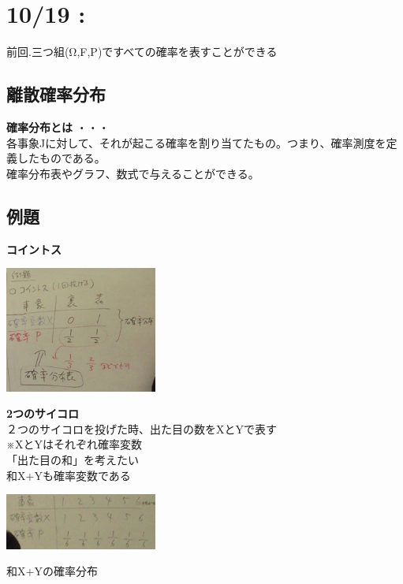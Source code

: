 \documentclass{jsarticle}
\begin{document}
\section{10/19 : }
	前回.三つ組(Ω,F,P)ですべての確率を表すことができる\\
	\subsection{離散確率分布}
		{\bf{確率分布とは}} ・・・ \\
		各事象Jに対して、それが起こる確率を割り当てたもの。つまり、確率測度を定義したものである。\\
		確率分布表やグラフ、数式で与えることができる。\\
	\subsection{例題}
		{\bf{コイントス}}
		\begin{center}
			\includegraphics[width=5cm]{10_19_1.JPG}
		\end{center}
		
		{\bf{2つのサイコロ}}\\
		２つのサイコロを投げた時、出た目の数をXとYで表す\\
		※XとYはそれぞれ確率変数\\
		「出た目の和」を考えたい\\
		和X+Yも確率変数である\\
		\begin{center}
			\includegraphics[width=5cm]{10_19_2.JPG}
		\end{center}
		
		和X+Yの確率分布
			
\end{document}
